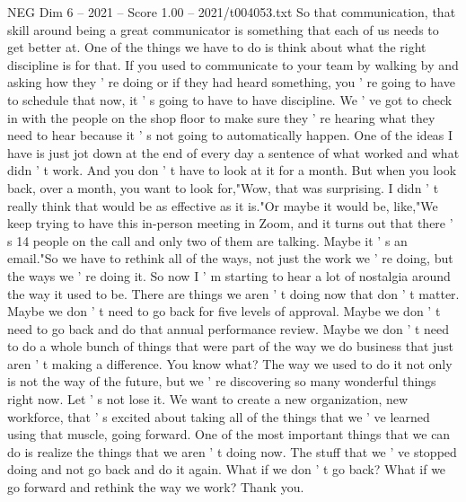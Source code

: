 \begin{textsample}{NEG Dim 6 – 2021 – Score 1.00 – 2021/t004053.txt}
So that communication, that skill around being a great communicator is something that each of us needs to get better at.
One of the things we have to do is think about what the right discipline is for that.
If you used to communicate to your team by walking by and asking how they ' re doing or if they had heard something, you ' re going to have to schedule that now, it ' s going to have to have discipline.
We ' ve got to check in with the people on the shop floor to make sure they ' re hearing what they need to hear because it ' s not going to automatically happen.
One of the ideas I have is just jot down at the end of every day a sentence of what worked and what didn ' t work.
And you don ' t have to look at it for a month.
But when you look back, over a month, you want to look for,"Wow, that was surprising.
I didn ' t really think that would be as effective as it is."Or maybe it would be, like,"We keep trying to have this in-person meeting in Zoom, and it turns out that there ' s 14 people on the call and only two of them are talking.
Maybe it ' s an email."So we have to rethink all of the ways, not just the work we ' re doing, but the ways we ' re doing it.
So now I ' m starting to hear a lot of nostalgia around the way it used to be.
There are things we aren ' t doing now that don ' t matter.
Maybe we don ' t need to go back for five levels of approval.
Maybe we don ' t need to go back and do that annual performance review.
Maybe we don ' t need to do a whole bunch of things that were part of the way we do business that just aren ' t making a difference.
You know what?
The way we used to do it not only is not the way of the future, but we ' re discovering so many wonderful things right now.
Let ' s not lose it.
We want to create a new organization, new workforce, that ' s excited about taking all of the things that we ' ve learned using that muscle, going forward.
One of the most important things that we can do is realize the things that we aren ' t doing now.
The stuff that we ' ve stopped doing and not go back and do it again.
What if we don ' t go back?
What if we go forward and rethink the way we work?
Thank you.

\end{textsample}
